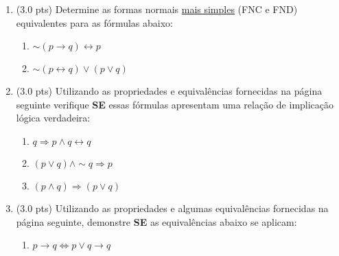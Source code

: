 \documentclass[12pt]{article}
\begin{document}
\begin{enumerate}
\item (3.0 pts) Determine as formas normais \underline{mais simples} (FNC e FND) equivalentes para as fórmulas abaixo: 

\begin{enumerate}
\setlength{\itemsep}{-5pt}

\item $\sim (p\rightarrow q)\leftrightarrow p$
\item $\sim(p\leftrightarrow q) \vee (p\vee q)$
\end{enumerate}

%
%
%

\item (3.0 pts) Utilizando as propriedades e equivalências
fornecidas na página seguinte verifique {\bf SE} 
essas fórmulas apresentam uma relaç\~ao de implicaç\~ao lógica  
verdadeira:

\begin{enumerate}
\setlength{\itemsep}{-2pt}

\item $q \Rightarrow p \wedge q \leftrightarrow q$

\item  $ (p \vee q) \wedge \sim q \Rightarrow p $


\item $(p \wedge q) \Rightarrow (p \vee q)$

\end{enumerate}


\item (3.0 pts) Utilizando as propriedades e algumas equivalências
fornecidas na página seguinte, demonstre {\bf SE} as equivalências abaixo 
se aplicam:

\begin{enumerate}
\setlength{\itemsep}{-2pt}

\item $p \rightarrow q \Leftrightarrow p \vee q \rightarrow  q$ %



\end{enumerate}
\end{enumerate}
\end{document}
